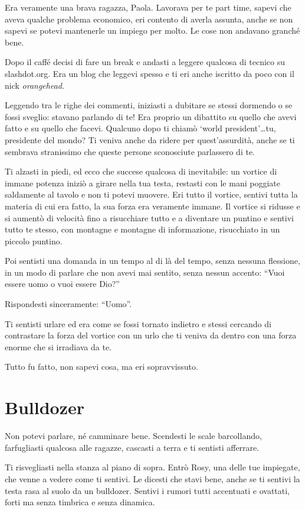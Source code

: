Era veramente una brava ragazza, Paola. Lavorava per te part time, sapevi che aveva qualche problema economico, eri contento di averla assunta, anche se non sapevi se potevi mantenerle un impiego per molto. Le cose non andavano granché bene.

Dopo il caffé decisi di fare un break e andasti a leggere qualcosa di tecnico su slashdot.org. Era un blog che leggevi spesso e ti eri anche iscritto da poco con il nick \textit{orangehead.}

Leggendo tra le righe dei commenti, iniziasti a dubitare se stessi dormendo o se fossi sveglio: stavano parlando di te! Era proprio un dibattito su quello che avevi fatto e su quello che facevi. Qualcuno dopo ti chiamò `world president'\ldots tu, presidente del mondo? Ti veniva anche da ridere per quest'assurdità, anche se ti sembrava stranissimo che queste persone sconosciute parlassero di te.

Ti alzasti in piedi, ed ecco che succese qualcosa di inevitabile: un vortice di immane potenza iniziò a girare nella tua testa, restasti con le mani poggiate saldamente al tavolo e non ti potevi muovere. Eri tutto il vortice, sentivi tutta la materia di cui era fatto, la sua forza era veramente immane. Il vortice si ridusse e si aumentò di velocità fino a risucchiare tutto e a diventare un puntino e sentivi tutto te stesso, con montagne e montagne di informazione, risucchiato in un piccolo puntino.

Poi sentisti una domanda in un tempo al di là del tempo, senza nessuna flessione, in un modo di parlare che non avevi mai sentito, senza nessun accento: “Vuoi essere uomo o vuoi essere Dio?”

Rispondesti sinceramente: “Uomo”.

Ti sentisti urlare ed era come se fossi tornato indietro e stessi cercando di contrastare la forza del vortice con un urlo che ti veniva da dentro con una forza enorme che si irradiava da te.

Tutto fu fatto, non sapevi cosa, ma eri sopravvissuto.

\section{Bulldozer}
\label{bulldozer} 

Non potevi parlare, né camminare bene. Scendesti le scale barcollando, farfugliasti qualcosa alle ragazze, cascasti a terra e ti sentisti afferrare.

Ti risvegliasti nella stanza al piano di sopra. Entrò Rosy, una delle tue impiegate, che venne a vedere come ti sentivi. Le dicesti che stavi bene, anche se ti sentivi la testa rasa al suolo da un bulldozer. Sentivi i rumori tutti accentuati e ovattati, forti ma senza timbrica e senza dinamica.

